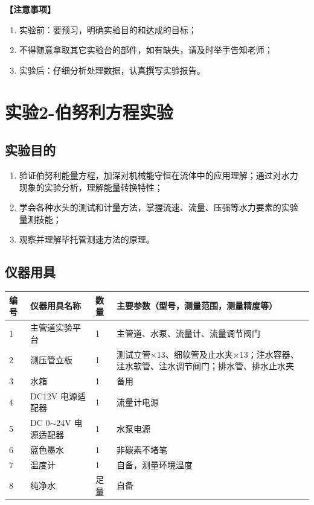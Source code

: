 \documentclass[dvipsnames, svgnames,a4paper,11pt]{article}
\begin{document}
{\textbf{【注意事项】}
\begin{enumerate}
	\item 实验前：要预习，明确实验目的和达成的目标；
	\item 不得随意拿取其它实验台的部件，如有缺失，请及时举手告知老师；
	\item 实验后：仔细分析处理数据，认真撰写实验报告。
\end{enumerate}}

\clearpage
\tableofcontents
\clearpage

\setcounter{section}{0}
\section{实验2-伯努利方程实验}
	
\subsection{实验目的}
\begin{enumerate}
	\item 验证伯努利能量方程，加深对机械能守恒在流体中的应用理解；通过对水力
	现象的实验分析，理解能量转换特性；
	\item 学会各种水头的测试和计量方法，掌握流速、流量、压强等水力要素的实验
	量测技能；
	\item 观察并理解毕托管测速方法的原理。
\end{enumerate}

\subsection{仪器用具}
\begin{table}[htbp]
	\centering
	\renewcommand\arraystretch{1.6}
	\begin{tabular}{p{}|p{}|p{}|p{}}
	\hline
	编号& 仪器用具名称 & 数量 &  主要参数（型号，测量范围，测量精度等） \\
	\hline
	1&主管道实验平台 &1 &主管道、水泵、流量计、流量调节阀门\\
	\hline
	2&测压管立板  &1&测试立管$\times$13、细软管及止水夹$\times$13；注水容器、注水软管、注水调节阀门；排水管、排水止水夹 \\
	\hline
	3&水箱 & 1 &备用 \\
	\hline
	4&DC12V 电源适配器&1 & 流量计电源\\
	\hline
	5&DC 0$\sim $24V 电源适配器&1&水泵电源\\
	\hline
	6&蓝色墨水&1&非碳素不堵笔\\
	\hline
	7&温度计&1&自备，测量环境温度\\
	\hline
	8&纯净水&足量&自备\\
	\hline
\end{tabular}
\end{table}
\end{document}
